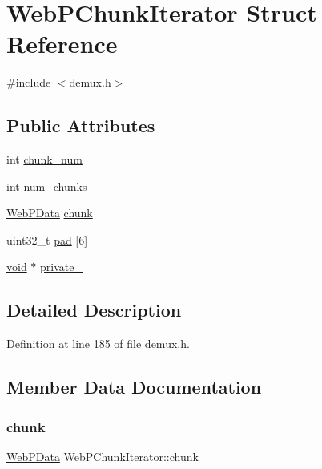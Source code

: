 \hypertarget{struct_web_p_chunk_iterator}{}\section{Web\+P\+Chunk\+Iterator Struct Reference}
\label{struct_web_p_chunk_iterator}


{\ttfamily \#include $<$demux.\+h$>$}

\subsection*{Public Attributes}
\begin{DoxyCompactItemize}
\item 
int \mbox{\hyperlink{struct_web_p_chunk_iterator_a0168f4885bbf94178f18ce723fbe0a9c}{chunk\+\_\+num}}
\item 
int \mbox{\hyperlink{struct_web_p_chunk_iterator_a4d797a96582041c23771839665ac8985}{num\+\_\+chunks}}
\item 
\mbox{\hyperlink{struct_web_p_data}{Web\+P\+Data}} \mbox{\hyperlink{struct_web_p_chunk_iterator_a87c8fda7a7ee251d71c9ce23bb948939}{chunk}}
\item 
uint32\+\_\+t \mbox{\hyperlink{struct_web_p_chunk_iterator_a589b67a342b9b73206683d80b073bc22}{pad}} \mbox{[}6\mbox{]}
\item 
\mbox{\hyperlink{_s_d_l__opengles2__gl2ext_8h_ae5d8fa23ad07c48bb609509eae494c95}{void}} $\ast$ \mbox{\hyperlink{struct_web_p_chunk_iterator_a40a8eaa0692d2165918e8558c18683b1}{private\+\_\+}}
\end{DoxyCompactItemize}


\subsection{Detailed Description}


Definition at line 185 of file demux.\+h.



\subsection{Member Data Documentation}
\mbox{\label{struct_web_p_chunk_iterator_a87c8fda7a7ee251d71c9ce23bb948939}} 
\subsubsection{\texorpdfstring{chunk}{chunk}}
{\footnotesize\ttfamily \mbox{\hyperlink{struct_web_p_data}{Web\+P\+Data}} Web\+P\+Chunk\+Iterator\+::chunk}



